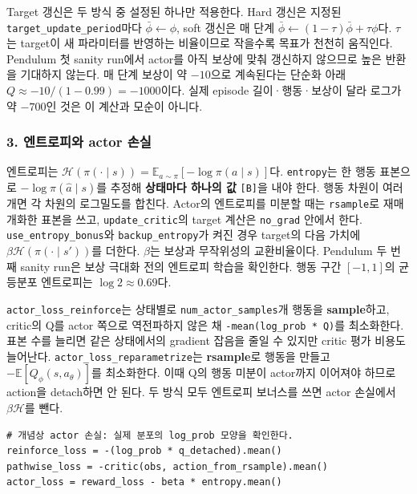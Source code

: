 \documentclass[11pt,a4paper]{article}
\begin{document}
Target 갱신은 두 방식 중 설정된 하나만 적용한다. Hard 갱신은 지정된 \texttt{target\_\allowbreak{}update\_\allowbreak{}period}마다 $\bar\phi\leftarrow\phi$, soft 갱신은 매 단계 $\bar\phi\leftarrow(1-\tau)\bar\phi+\tau\phi$다. $\tau$는 target이 새 파라미터를 반영하는 비율이므로 작을수록 목표가 천천히 움직인다. Pendulum 첫 sanity run에서 actor를 아직 보상에 맞춰 갱신하지 않으므로 높은 반환을 기대하지 않는다. 매 단계 보상이 약 $-10$으로 계속된다는 단순화 아래 $Q\approx-10/(1-0.99)=-1000$이다. 실제 episode 길이·행동·보상이 달라 로그가 약 $-700$인 것은 이 계산과 모순이 아니다.\par

\subsubsection{3. 엔트로피와 actor 손실}

엔트로피는 $\mathcal H(\pi(\cdot\mid s))=\mathbb E_{a\sim\pi}[-\log\pi(a\mid s)]$다. \texttt{entropy}는 한 행동 표본으로 $-\log\pi(\hat a\mid s)$를 추정해 \textbf{상태마다 하나의 값} \texttt{[B]}을 내야 한다. 행동 차원이 여러 개면 각 차원의 로그밀도를 합친다. Actor의 엔트로피를 미분할 때는 \texttt{rsample}로 재매개화한 표본을 쓰고, \texttt{update\_\allowbreak{}critic}의 target 계산은 \texttt{no\_\allowbreak{}grad} 안에서 한다. \texttt{use\_\allowbreak{}entropy\_\allowbreak{}bonus}와 \texttt{backup\_\allowbreak{}entropy}가 켜진 경우 target의 다음 가치에 $\beta\mathcal H(\pi(\cdot\mid s'))$를 더한다. $\beta$는 보상과 무작위성의 교환비율이다. Pendulum 두 번째 sanity run은 보상 극대화 전의 엔트로피 학습을 확인한다. 행동 구간 $[-1,1]$의 균등분포 엔트로피는 $\log2\approx0.69$다.\par

\texttt{actor\_\allowbreak{}loss\_\allowbreak{}reinforce}는 상태별로 \texttt{num\_\allowbreak{}actor\_\allowbreak{}samples}개 행동을 \textbf{sample}하고, critic의 Q를 actor 쪽으로 역전파하지 않은 채 \texttt{-mean(log\_\allowbreak{}prob * Q)}를 최소화한다. 표본 수를 늘리면 같은 상태에서의 gradient 잡음을 줄일 수 있지만 critic 평가 비용도 늘어난다. \texttt{actor\_\allowbreak{}loss\_\allowbreak{}reparametrize}는 \textbf{rsample}로 행동을 만들고 $-\mathbb E[Q_\phi(s,a_\theta)]$를 최소화한다. 이때 Q의 행동 미분이 actor까지 이어져야 하므로 action을 detach하면 안 된다. 두 방식 모두 엔트로피 보너스를 쓰면 actor 손실에서 $\beta\mathcal H$를 뺀다.\par

\begin{verbatim}
# 개념상 actor 손실: 실제 분포의 log_prob 모양을 확인한다.
reinforce_loss = -(log_prob * q_detached).mean()
pathwise_loss = -critic(obs, action_from_rsample).mean()
actor_loss = reward_loss - beta * entropy.mean()
\end{verbatim}
\end{document}
